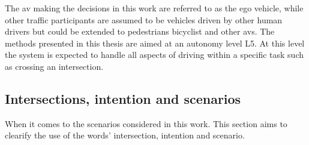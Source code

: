
The \gls{av} making the decisions in this work are referred to as the ego vehicle, while other traffic participants are assumed to be vehicles driven by other human drivers but could be extended to pedestrians bicyclist and other \gls{av}s. 
The methods presented in this thesis are aimed at an autonomy level L5. At this level the system is expected to handle all aspects of driving within a specific task such as crossing an intersection. 

\subsection{Intersections, intention and scenarios}
\label{sec:intro_intersections}
When it comes to the scenarios considered in this work. This section aims to clearify the use of the words' intersection, intention and scenario.


